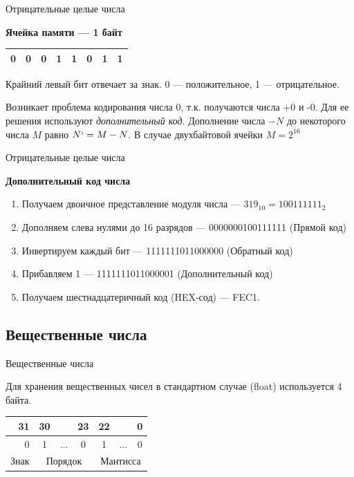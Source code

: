 \begin{frame}{Отрицательные целые числа}

\textbf{Ячейка памяти --- 1 байт}
\begin{table}
	\centering
		\begin{tabular}{|c|c|c|c|c|c|c|c|}\hline
		  \alert{0} & 0 & 0 & 1 & 1 & 0 & 1 & 1\\ 
		\hline
		\end{tabular}
\end{table}

Крайний левый бит отвечает за знак. 0 --- положительное, 1 --- отрицательное.

Возникает проблема кодирования числа 0, т.к. получаются числа +0 и -0.
Для ее решения используют \textit{дополнительный код}.
Дополнение числа $-N$  до некоторого числа $M$ равно $N`=M-N$.
В случае двухбайтовой ячейки $M=2^{16}$


\end{frame}
\begin{frame}{Отрицательные целые числа}

\textbf{Дополнительный код числа}
\begin{enumerate}
\item{Получаем двоичное представление модуля числа --- $319_{10}=100111111_2$}
\item{Дополняем слева нулями до 16 разрядов --- 0000000100111111 (Прямой код)}
\item{Инвертируем каждый бит --- 1111111011000000 (Обратный код)}
\item{Прибавляем 1 --- 1111111011000001 (Дополнительный код)}
\item{Получаем шестнадцатеричный код (HEX-сод) --- FEC1.}
\end{enumerate}

\end{frame}

\subsection{Вещественные числа}

\begin{frame}{Вещественные числа}

Для хранения вещественных чисел в стандартном случае (float) используется 4 байта.

\begin{table}
	\centering
		\begin{tabular}{|r|ccc|ccc|}\hline
		  31 & 30 & ~ & 23 & 22 & ~ & 0\\ \hline
		  0 & 1 & $\ldots$ & 0 & 1 & $\ldots$ & 0\\  \hline
		  Знак & \multicolumn{3}{|c|}{Порядок}  & \multicolumn{3}{|c|}{Мантисса}\\
		\hline
		\end{tabular}
\end{table}

\end{frame}

